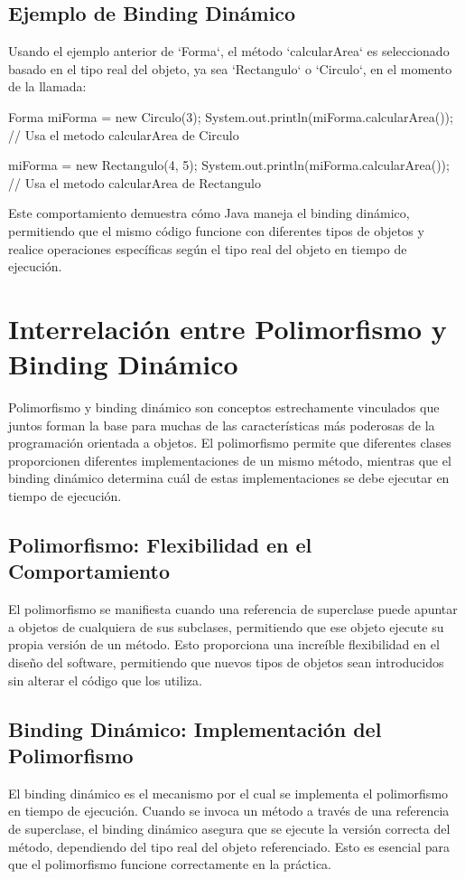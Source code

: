\documentclass[a4paper]{report}
\begin{document}
\subsection{Ejemplo de Binding Dinámico}
Usando el ejemplo anterior de `Forma`, el método `calcularArea` es seleccionado basado en el tipo real del objeto, ya sea `Rectangulo` o `Circulo`, en el momento de la llamada:

\begin{roundedlst}
Forma miForma = new Circulo(3);
System.out.println(miForma.calcularArea());  
// Usa el metodo calcularArea de Circulo

miForma = new Rectangulo(4, 5);
System.out.println(miForma.calcularArea());  
// Usa el metodo calcularArea de Rectangulo
\end{roundedlst}

Este comportamiento demuestra cómo Java maneja el binding dinámico, permitiendo que el mismo código funcione con diferentes tipos de objetos y realice operaciones específicas según el tipo real del objeto en tiempo de ejecución.

\section{Interrelación entre Polimorfismo y Binding Dinámico}
Polimorfismo y binding dinámico son conceptos estrechamente vinculados que juntos forman la base para muchas de las características más poderosas de la programación orientada a objetos. El polimorfismo permite que diferentes clases proporcionen diferentes implementaciones de un mismo método, mientras que el binding dinámico determina cuál de estas implementaciones se debe ejecutar en tiempo de ejecución.

\subsection{Polimorfismo: Flexibilidad en el Comportamiento}
El polimorfismo se manifiesta cuando una referencia de superclase puede apuntar a objetos de cualquiera de sus subclases, permitiendo que ese objeto ejecute su propia versión de un método. Esto proporciona una increíble flexibilidad en el diseño del software, permitiendo que nuevos tipos de objetos sean introducidos sin alterar el código que los utiliza.

\subsection{Binding Dinámico: Implementación del Polimorfismo}
El binding dinámico es el mecanismo por el cual se implementa el polimorfismo en tiempo de ejecución. Cuando se invoca un método a través de una referencia de superclase, el binding dinámico asegura que se ejecute la versión correcta del método, dependiendo del tipo real del objeto referenciado. Esto es esencial para que el polimorfismo funcione correctamente en la práctica.
\end{document}

